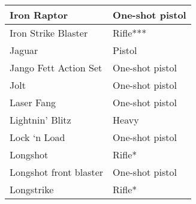 \documentclass{scrbook}
\begin{document}
\begin{table}
\begin{tabular}{|l|l|}
 \hline Iron Raptor & One-shot pistol \\
 \hline Iron Strike Blaster & Rifle*** \\
 \hline Jaguar & Pistol \\
 \hline Jango Fett Action Set & One-shot pistol \\
 \hline Jolt & One-shot pistol \\
 \hline Laser Fang & One-shot pistol \\
 \hline Lightnin' Blitz & Heavy \\
 \hline Lock `n Load & One-shot pistol \\
 \hline Longshot & Rifle* \\
 \hline Longshot front blaster & One-shot pistol \\
 \hline Longstrike & Rifle* \\
 \hline \end{tabular}

\end{table}
\end{document}
